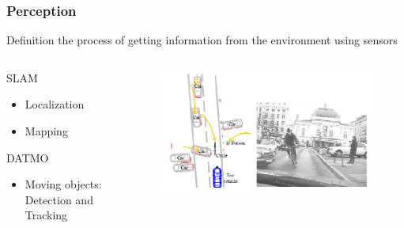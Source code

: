 \documentclass{beamer}
\begin{document}
	\begin{frame}
		\frametitle{Perception}
	
			\begin{block}{Definition}
				the process of getting information from the environment using sensors
			\end{block}	
	
		  \begin{columns}[t]
		  \begin{column}{4cm}
		  	\small
			\begin{exampleblock}{SLAM}		
		
			\begin{itemize}
			\item Localization
			\item Mapping
			\end{itemize}			
			
			\end{exampleblock}					
				
		\begin{exampleblock}{DATMO}		
			\begin{itemize}
			\item Moving objects: Detection and Tracking
			\end{itemize}			
			
		\end{exampleblock}	
		  \end{column}
		  
		  \begin{column}{6cm}
			\begin{figure}[h]
			\center
			\includegraphics[scale=0.3]{img/perception}
		\end{figure}	
		  \end{column}
		 \end{columns}		 	
	
					
	
	\end{frame}	
	
\end{document}
